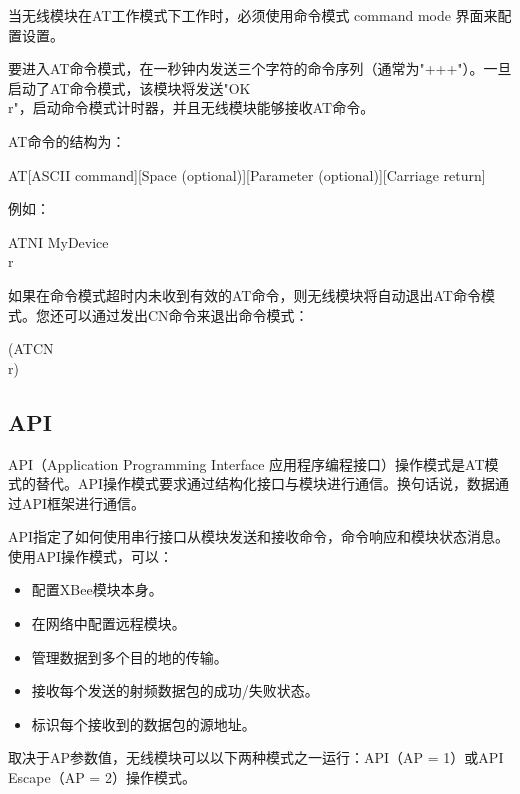 当无线模块在AT工作模式下工作时，必须使用命令模式 command mode 界面来配置设置。

要进入AT命令模式，在一秒钟内发送三个字符的命令序列（通常为"+++"）。一旦启动了AT命令模式，该模块将发送"OK \\ r"，启动命令模式计时器，并且无线模块能够接收AT命令。

AT命令的结构为：

\begin{tcolorbox}
    AT[ASCII command][Space (optional)][Parameter (optional)][Carriage return]
\end{tcolorbox}

例如：

\begin{tcolorbox}
    ATNI MyDevice\\r
\end{tcolorbox}

如果在命令模式超时内未收到有效的AT命令，则无线模块将自动退出AT命令模式。您还可以通过发出CN命令来退出命令模式：

\begin{tcolorbox}
    (ATCN\\r)
\end{tcolorbox}

\subsection{API}

API（Application Programming Interface 应用程序编程接口）操作模式是AT模式的替代。API操作模式要求通过结构化接口与模块进行通信。换句话说，数据通过API框架进行通信。

API指定了如何使用串行接口从模块发送和接收命令，命令响应和模块状态消息。使用API​​操作模式，可以：

\begin{itemize}
    \item 配置XBee模块本身。
    \item 在网络中配置远程模块。
    \item 管理数据到多个目的地的传输。
    \item 接收每个发送的射频数据包的成功/失败状态。
    \item 标识每个接收到的数据包的源地址。
\end{itemize}

取决于AP参数值，无线模块可以以下两种模式之一运行：API（AP = 1）或API Escape（AP = 2）操作模式。